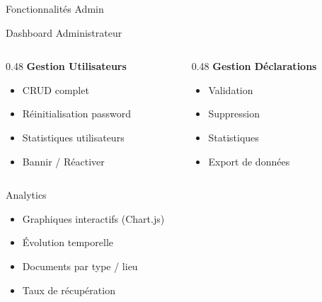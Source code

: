 \documentclass[aspectratio=169]{beamer}
\begin{document}
\begin{frame}{Fonctionnalités Admin}
    \begin{block}{Dashboard Administrateur}
        \begin{columns}[T]
            \begin{column}{0.48\textwidth}
                \textbf{Gestion Utilisateurs}
                \begin{itemize}
                    \item CRUD complet
                    \item Réinitialisation password
                    \item Statistiques utilisateurs
                    \item Bannir / Réactiver
                \end{itemize}
            \end{column}
            \begin{column}{0.48\textwidth}
                \textbf{Gestion Déclarations}
                \begin{itemize}
                    \item Validation
                    \item Suppression
                    \item Statistiques
                    \item Export de données
                \end{itemize}
            \end{column}
        \end{columns}
    \end{block}

    \vspace{0.3cm}

    \begin{block}{Analytics}
        \begin{itemize}
            \item Graphiques interactifs (Chart.js)
            \item Évolution temporelle
            \item Documents par type / lieu
            \item Taux de récupération
        \end{itemize}
    \end{block}
\end{frame}

\end{document}
